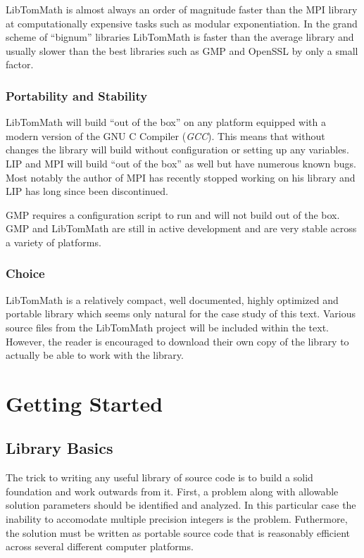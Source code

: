 \documentclass[b5paper]{book}
\begin{document}
LibTomMath is almost always an order of magnitude faster than the MPI library at computationally expensive tasks such as modular
exponentiation.  In the grand scheme of ``bignum'' libraries LibTomMath is faster than the average library and usually  
slower than the best libraries such as GMP and OpenSSL by only a small factor.

\subsection{Portability and Stability}
LibTomMath will build ``out of the box'' on any platform equipped with a modern version of the GNU C Compiler 
(\textit{GCC}).  This means that without changes the library will build without configuration or setting up any 
variables.  LIP and MPI will build ``out of the box'' as well but have numerous known bugs.  Most notably the author of 
MPI has recently stopped working on his library and LIP has long since been discontinued.  

GMP requires a configuration script to run and will not build out of the box.   GMP and LibTomMath are still in active
development and are very stable across a variety of platforms.

\subsection{Choice}
LibTomMath is a relatively compact, well documented, highly optimized and portable library which seems only natural for
the case study of this text.  Various source files from the LibTomMath project will be included within the text.  However, 
the reader is encouraged to download their own copy of the library to actually be able to work with the library.  

\chapter{Getting Started}
\section{Library Basics}
The trick to writing any useful library of source code is to build a solid foundation and work outwards from it.  First, 
a problem along with allowable solution parameters should be identified and analyzed.  In this particular case the 
inability to accomodate multiple precision integers is the problem.  Futhermore, the solution must be written
as portable source code that is reasonably efficient across several different computer platforms.
\end{document}
